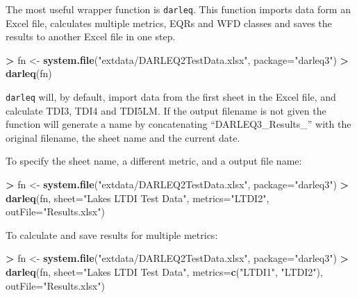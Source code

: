 \documentclass[]{article}
\newenvironment{Shaded}{\begin{snugshade}}{\end{snugshade}}
\newcommand{\KeywordTok}[1]{\textcolor[rgb]{0.13,0.29,0.53}{\textbf{#1}}}
\newcommand{\DataTypeTok}[1]{\textcolor[rgb]{0.13,0.29,0.53}{#1}}
\newcommand{\StringTok}[1]{\textcolor[rgb]{0.31,0.60,0.02}{#1}}
\newcommand{\OperatorTok}[1]{\textcolor[rgb]{0.81,0.36,0.00}{\textbf{#1}}}
\newcommand{\NormalTok}[1]{#1}
\begin{document}
The most useful wrapper function is \texttt{darleq}. This function
imports data form an Excel file, calculates multiple metrics, EQRs and
WFD classes and saves the results to another Excel file in one step.

\begin{Shaded}
\begin{Highlighting}[]
\OperatorTok{>}\StringTok{ }\NormalTok{fn <-}\StringTok{ }\KeywordTok{system.file}\NormalTok{(}\StringTok{"extdata/DARLEQ2TestData.xlsx"}\NormalTok{, }\DataTypeTok{package=}\StringTok{"darleq3"}\NormalTok{)}
\OperatorTok{>}\StringTok{ }\KeywordTok{darleq}\NormalTok{(fn)}
\end{Highlighting}
\end{Shaded}

\texttt{darleq} will, by default, import data from the first sheet in
the Excel file, and calculate TDI3, TDI4 and TDI5LM. If the output
filename is not given the function will generate a name by concatenating
``DARLEQ3\_Results\_'' with the original filename, the sheet name and
the current date.

To specify the sheet name, a different metric, and a output file name:

\begin{Shaded}
\begin{Highlighting}[]
\OperatorTok{>}\StringTok{ }\NormalTok{fn <-}\StringTok{ }\KeywordTok{system.file}\NormalTok{(}\StringTok{"extdata/DARLEQ2TestData.xlsx"}\NormalTok{, }\DataTypeTok{package=}\StringTok{"darleq3"}\NormalTok{)}
\OperatorTok{>}\StringTok{ }\KeywordTok{darleq}\NormalTok{(fn, }\DataTypeTok{sheet=}\StringTok{"Lakes LTDI Test Data"}\NormalTok{, }\DataTypeTok{metrics=}\StringTok{"LTDI2"}\NormalTok{, }\DataTypeTok{outFile=}\StringTok{"Results.xlsx"}\NormalTok{)}
\end{Highlighting}
\end{Shaded}

To calculate and save results for multiple metrics:

\begin{Shaded}
\begin{Highlighting}[]
\OperatorTok{>}\StringTok{ }\NormalTok{fn <-}\StringTok{ }\KeywordTok{system.file}\NormalTok{(}\StringTok{"extdata/DARLEQ2TestData.xlsx"}\NormalTok{, }\DataTypeTok{package=}\StringTok{"darleq3"}\NormalTok{)}
\OperatorTok{>}\StringTok{ }\KeywordTok{darleq}\NormalTok{(fn, }\DataTypeTok{sheet=}\StringTok{"Lakes LTDI Test Data"}\NormalTok{, }\DataTypeTok{metrics=}\KeywordTok{c}\NormalTok{(}\StringTok{"LTDI1"}\NormalTok{, }\StringTok{"LTDI2"}\NormalTok{), }\DataTypeTok{outFile=}\StringTok{"Results.xlsx"}\NormalTok{)}
\end{Highlighting}
\end{Shaded}
\end{document}

